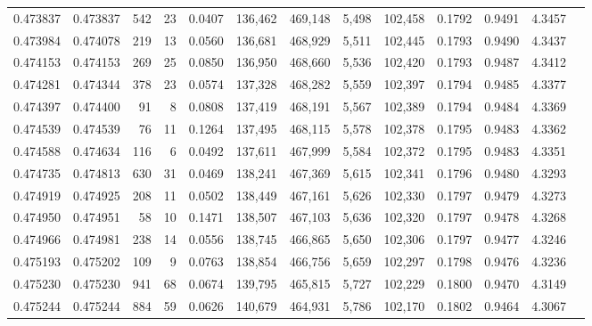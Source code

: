 \begin{tabular}{rrrrrrrrrrrrr}
0.473837 & 0.473837 &   542 &    23 &                                     0.0407 & 136,462 & 469,148 &   5,498 & 102,458 & 0.1792 & 0.9491 & 4.3457 \\
0.473984 & 0.474078 &   219 &    13 &                                     0.0560 & 136,681 & 468,929 &   5,511 & 102,445 & 0.1793 & 0.9490 & 4.3437 \\
0.474153 & 0.474153 &   269 &    25 &                                     0.0850 & 136,950 & 468,660 &   5,536 & 102,420 & 0.1793 & 0.9487 & 4.3412 \\
0.474281 & 0.474344 &   378 &    23 &                                     0.0574 & 137,328 & 468,282 &   5,559 & 102,397 & 0.1794 & 0.9485 & 4.3377 \\
0.474397 & 0.474400 &    91 &     8 &                                     0.0808 & 137,419 & 468,191 &   5,567 & 102,389 & 0.1794 & 0.9484 & 4.3369 \\
0.474539 & 0.474539 &    76 &    11 &                                     0.1264 & 137,495 & 468,115 &   5,578 & 102,378 & 0.1795 & 0.9483 & 4.3362 \\
0.474588 & 0.474634 &   116 &     6 &                                     0.0492 & 137,611 & 467,999 &   5,584 & 102,372 & 0.1795 & 0.9483 & 4.3351 \\
0.474735 & 0.474813 &   630 &    31 &                                     0.0469 & 138,241 & 467,369 &   5,615 & 102,341 & 0.1796 & 0.9480 & 4.3293 \\
0.474919 & 0.474925 &   208 &    11 &                                     0.0502 & 138,449 & 467,161 &   5,626 & 102,330 & 0.1797 & 0.9479 & 4.3273 \\
0.474950 & 0.474951 &    58 &    10 &                                     0.1471 & 138,507 & 467,103 &   5,636 & 102,320 & 0.1797 & 0.9478 & 4.3268 \\
0.474966 & 0.474981 &   238 &    14 &                                     0.0556 & 138,745 & 466,865 &   5,650 & 102,306 & 0.1797 & 0.9477 & 4.3246 \\
0.475193 & 0.475202 &   109 &     9 &                                     0.0763 & 138,854 & 466,756 &   5,659 & 102,297 & 0.1798 & 0.9476 & 4.3236 \\
0.475230 & 0.475230 &   941 &    68 &                                     0.0674 & 139,795 & 465,815 &   5,727 & 102,229 & 0.1800 & 0.9470 & 4.3149 \\
0.475244 & 0.475244 &   884 &    59 &                                     0.0626 & 140,679 & 464,931 &   5,786 & 102,170 & 0.1802 & 0.9464 & 4.3067 \\

\end{tabular}
